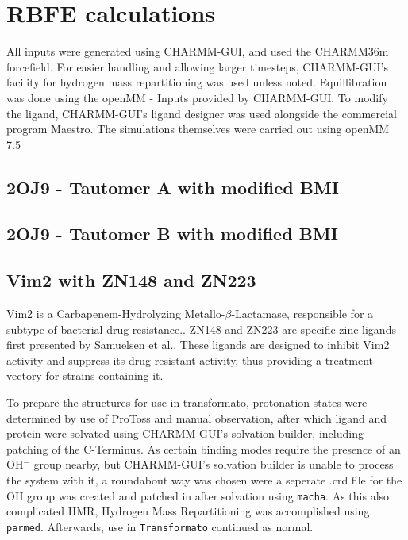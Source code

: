 \documentclass[oneside]{scrreprt}
\begin{document}
\section{RBFE calculations}
All inputs were generated using CHARMM-GUI\supercite{Jo2008Aug}, and used the CHARMM36m forcefield\supercite{Huang2017Jan}. For easier handling and allowing larger timesteps, CHARMM-GUI's facility for hydrogen mass repartitioning\supercite{Gao2021Feb} was used unless noted. Equillibration was done using the openMM - Inputs provided by CHARMM-GUI\supercite{Brooks2009Jul,Lee2016Jan}. To modify the ligand, CHARMM-GUI's ligand designer\supercite{Guterres2021Nov} was used alongside the commercial program Maestro\supercite{maestro}. The simulations themselves were carried out using openMM 7.5\supercite{Eastman2017Jul}


\subsection{2OJ9 - Tautomer A with modified BMI}
\subsection{2OJ9 - Tautomer B with modified BMI}
\subsection{Vim2 with ZN148 and ZN223}
Vim2 is a Carbapenem-Hydrolyzing Metallo-$\beta$-Lactamase, responsible for a subtype of bacterial drug resistance.\supercite{Poirel2000Apr}. ZN148 and ZN223 are specific zinc ligands first presented by Samuelsen et al.\supercite{Samuelsen2020Jun}. These ligands are designed to inhibit Vim2 activity and suppress its drug-resistant activity, thus providing a treatment vectory for strains containing it. 

To prepare the structures for use in transformato, protonation states were determined by use of ProToss\supercite{Lippert2009Dec,Bietz2014Dec} and manual observation, after which ligand and protein were solvated using CHARMM-GUI's solvation builder, including patching of the C-Terminus. As certain binding modes require the presence of an OH$^-$ group nearby, but CHARMM-GUI's solvation builder is unable to process the system with it, a roundabout way was chosen were a seperate .crd file for the OH group was created and patched in after solvation using \texttt{macha}\supercite{twotoneblue2022May}. As this also complicated HMR, Hydrogen Mass Repartitioning was accomplished using \texttt{parmed}\supercite{Shirts2016Sep}. Afterwards, use in \texttt{Transformato} continued as normal.
\end{document}
